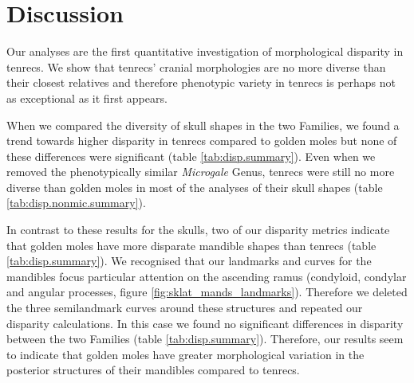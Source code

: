 \documentclass[12pt,a4paper]{article}
\begin{document}
\section{Discussion} 


	Our analyses are the first quantitative investigation of morphological disparity in tenrecs. We show that tenrecs' cranial morphologies are no more diverse than their closest relatives and therefore phenotypic variety in tenrecs is perhaps not as exceptional as it first appears.
	
	When we compared the diversity of skull shapes in the two Families, we found a trend towards higher disparity in tenrecs compared to golden moles but none of these differences were significant (table \ref{tab:disp.summary}). Even when we removed the phenotypically similar \textit{Microgale} Genus, tenrecs were still no more diverse than golden moles in most of the analyses of their skull shapes (table \ref{tab:disp.nonmic.summary}). 
	
	In contrast to these results for the skulls, two of our disparity metrics indicate that golden moles have more disparate mandible shapes than tenrecs (table \ref{tab:disp.summary}).
	We recognised that our landmarks and curves for the mandibles focus particular attention on the ascending ramus (condyloid, condylar and angular processes, figure \ref{fig:sklat_mands_landmarks}). Therefore we deleted the three semilandmark curves around these structures and repeated our disparity calculations. In this case we found no significant differences in disparity between the two Families (table \ref{tab:disp.summary}). Therefore, our results seem to indicate that golden moles have greater morphological variation in the posterior structures of their mandibles compared to tenrecs.
		
		
\end{document}
